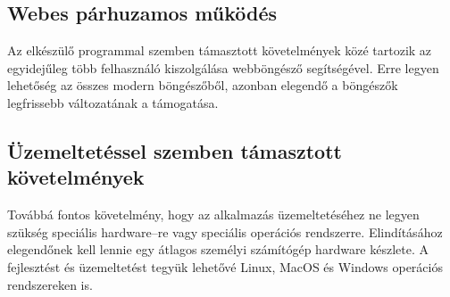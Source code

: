 \subsection{Webes párhuzamos működés}

Az elkészülő programmal szemben támasztott követelmények közé tartozik az egyidejűleg több felhasználó kiszolgálása webböngésző segítségével.
Erre legyen lehetőség az összes modern böngészőből, azonban elegendő a böngészők legfrissebb változatának a támogatása.

\subsection{Üzemeltetéssel szemben támasztott követelmények}
Továbbá fontos követelmény, hogy az alkalmazás üzemeltetéséhez ne legyen szükség speciális hardware–re vagy speciális operációs rendszerre. 
Elindításához elegendőnek kell lennie egy átlagos személyi számítógép hardware készlete. 
A fejlesztést és üzemeltetést tegyük lehetővé Linux, MacOS és Windows operációs rendszereken is. 
